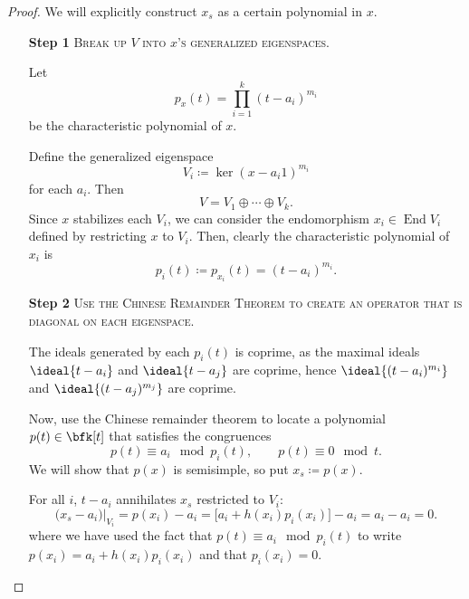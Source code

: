 \documentclass{article}
\DeclarePairedDelimiter\ideal\langle\rangle
\DeclareMathOperator{\End}{End}
\begin{document}
\begin{proof}
    We will explicitly construct $x_s$ as a certain polynomial in $x$.

    \begin{itemize}
        \item[\textbf{Step 1}] 
            \textsc{\color{Crimson} Break up $V$ into $x$'s generalized eigenspaces.}

            Let
            \[
                p_x(t)
                =
                \prod_{i=1}^k
                (t - a_i)^{m_i}
            \]
            be the characteristic polynomial of $x$.

            Define the generalized eigenspace
            \[
                V_i
                \coloneq
                \ker (x - a_i 1)^{m_i}
            \]
            for each $a_i$.
            Then
            \[
                V 
                =
                V_1 \oplus \cdots \oplus V_k.
            \]
            Since $x$ stabilizes each $V_i$, we can consider the endomorphism $x_i \in \End V_i$ defined by restricting $x$ to $V_i$.
            Then, clearly the characteristic polynomial of $x_i$ is
            \[
                p_i(t)
                \coloneq
                p_{x_i}(t)
                =
                (t-a_i)^{m_i}.
            \]
        \item[\textbf{Step 2}] 
            \textsc{\color{Crimson} Use the Chinese Remainder Theorem to create an operator that is diagonal on each eigenspace.}

            The ideals generated by each $p_i(t)$ is coprime, as
            the maximal ideals $\ideal{t-a_i}$ and $\ideal{t-a_j}$ are coprime, hence $\ideal{(t-a_i)^{m_i}}$ and $\ideal{(t-a_j)^{m_j}}$ are coprime.

            Now, use the Chinese remainder theorem to locate a polynomial $p(t) \in \bfk[t]$ that satisfies the congruences
            \[
                p(t)
                \equiv
                a_i \mod p_i(t)
                ,\qquad
                p(t)
                \equiv
                0 \mod t.
            \]
            We will show that $p(x)$ is semisimple, so put $x_s \coloneq p(x)$.

            For all $i$, $t - a_i$ annihilates $x_s$ restricted to $V_i$:
            \[
                \big(x_s - a_i\big)\big\rvert_{V_i}
                =
                p(x_i) - a_i
                =
                \big[a_i + h(x_i)p_i(x_i)\big] - a_i
                =
                a_i - a_i
                =
                0.
            \]
            where we have used the fact that $p(t) \equiv a_i \mod p_i(t)$ to write $p(x_i) = a_i + h(x_i)p_i(x_i)$ and that $p_i(x_i) = 0$.
    \end{itemize}

\end{proof}
\end{document}
